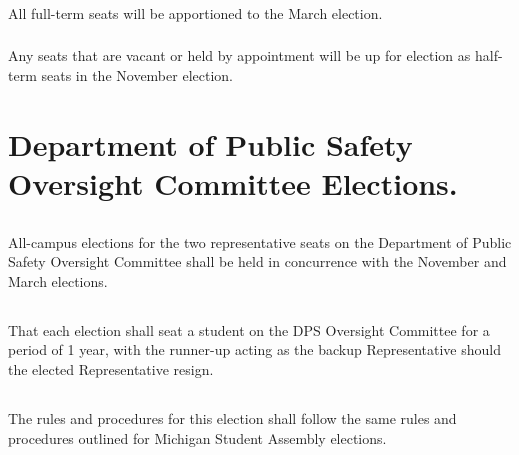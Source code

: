 \subsubsection{}
All full-term seats will be apportioned to the March election.
\subsubsection{}
Any seats that are vacant or held by appointment will be up for election as half-term seats in the November election.


\section{Department of Public Safety Oversight Committee Elections.}
\subsection{}
All-campus elections for the two representative seats on the Department of Public Safety Oversight Committee shall be held in concurrence with the November and March elections.
\subsection{}
That  each election shall seat a student on the DPS Oversight Committee for a period of 1 year, with the runner-up acting as the backup Representative should the elected Representative resign.
\subsection{}
The rules and procedures for this election shall follow the same rules and procedures outlined for Michigan Student Assembly elections.

